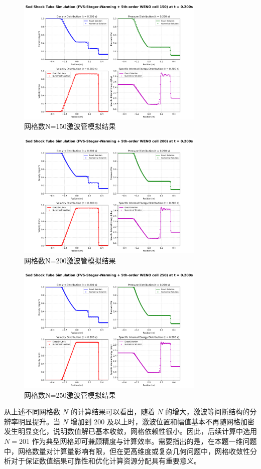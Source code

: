 \documentclass[12pt,a4paper]{article}
\begin{document}
\begin{figure}[!htbp]
    \centering
    \includegraphics[width=0.8\textwidth]{FVS-Steger-Warming + 5th-order WENO cell 150_t_0p200s.png}
    \caption{网格数N=150激波管模拟结果}
\end{figure}
\begin{figure}[!htbp]
    \centering
    \includegraphics[width=0.8\textwidth]{FVS-Steger-Warming + 5th-order WENO cell 200_t_0p200s.png}
    \caption{网格数N=200激波管模拟结果}
\end{figure}
\begin{figure}[!htbp]
    \centering
    \includegraphics[width=0.8\textwidth]{FVS-Steger-Warming + 5th-order WENO cell 250_t_0p200s.png}
    \caption{网格数N=250激波管模拟结果}
\end{figure}
从上述不同网格数 $N$ 的计算结果可以看出，随着 $N$ 的增大，激波等间断结构的分辨率明显提升。当 $N$ 增加到 200 及以上时，激波位置和幅值基本不再随网格加密发生明显变化，说明数值解已基本收敛，网格依赖性很小。因此，后续计算中选用 $N=201$ 作为典型网格即可兼顾精度与计算效率。需要指出的是，在本题一维问题中，网格数量对计算量影响有限，但在更高维度或复杂几何问题中，网格收敛性分析对于保证数值结果可靠性和优化计算资源分配具有重要意义。
\newpage  
\end{document}
